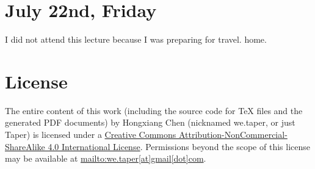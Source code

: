 \documentclass{article}
\numberwithin{equation}{subsection} %
\theoremstyle{definition}
\begin{document}
\section{July 22nd, Friday}
\label{sec:July_22ed_Friday}

I did not attend this lecture because I was preparing for travel.
home.

\section{License}
The entire content of this work (including the source code
for TeX files and the generated PDF documents) by 
Hongxiang Chen (nicknamed we.taper, or just Taper) is
licensed under a 
\href{http://creativecommons.org/licenses/by-nc-sa/4.0/}{Creative 
Commons Attribution-NonCommercial-ShareAlike 4.0 International 
License}. Permissions beyond the scope of this 
license may be available at \url{mailto:we.taper[at]gmail[dot]com}.
\end{document}

